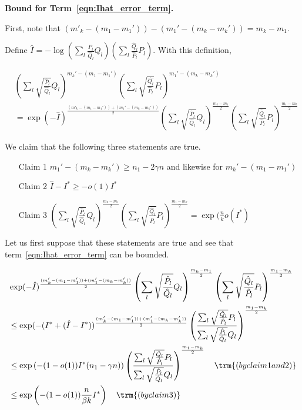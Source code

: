 \documentclass{article}
\begin{document}
\textbf{Bound for Term~\ref{eqn:Ihat_error_term}.}

First, note that $ (m'_k - (m_1 - m_1')) - (m_1' - (m_k - m_k')) = m_k - m_1$.

Define 
$\hat{I} = - \log \left( \sum_l \frac{\hat{P}_l}{\hat{Q}_l} Q_l \right) \left( \sum_l \frac{\hat{Q}_l}{\hat{P}_l} P_l \right) $. 
With this definition, 

\begin{align*}
& \left( \sum_l \sqrt{\frac{\hat{P}_l}{\hat{Q}_l} } Q_l \right)^{m_k' - (m_1 - m_1')} 
       \left( \sum_l \sqrt{\frac{\hat{Q_l}}{\hat{P}_l} } P_l \right)^{m_1' - (m_k - m_k')} \\
&= \exp( - \hat{I} )^{\frac{(m'_k - (m_1 - m_1')) + (m_1' - (m_k - m_k'))}{2}}  \left( \sum_l \sqrt{\frac{\hat{P}_l}{\hat{Q}_l}} Q_l \right)^{\frac{m_k - m_1}{2}} 
 \left( \sum_l \sqrt{\frac{\hat{Q}_l}{\hat{P}_l}} P_l \right)^{\frac{m_1 - m_k}{2}} 
\end{align*}

We claim that the following three statements are true. 
\begin{enumerate}
\item[Claim 1] $m_1' - (m_k - m_k') \geq n_1 - 2 \gamma n$ and likewise for $m_k' - (m_1 - m_1')$
\item[Claim 2] $\hat{I} - I^* \geq - o(1) I^*$
\item[Claim 3] $\left( \sum_l \sqrt{\frac{\hat{P}_l}{\hat{Q}_l}} Q_l \right)^{\frac{m_k - m_1}{2}} 
 \left( \sum_l \sqrt{\frac{\hat{Q}_l}{\hat{P}_l}} P_l \right)^{\frac{m_1 - m_k}{2}} = \exp(\frac{n}{k}  o(I^*)  $
\end{enumerate}

Let us first suppose that these statements are true and see that term~\ref{eqn:Ihat_error_term} can be bounded. 


\begin{align*}
& \exp( - \hat{I} )^{\frac{(m'_k - (m_1 - m_1')) + (m_1' - (m_k - m_k'))}{2}}  \left( \sum_l \sqrt{\frac{\hat{P}_l}{\hat{Q}_l}} Q_l \right)^{\frac{m_k - m_1}{2}} 
 \left( \sum_l \sqrt{\frac{\hat{Q}_l}{\hat{P}_l}} P_l \right)^{\frac{m_1 - m_k}{2}}  \\
&\leq  \exp( - (I^* + (\hat{I} - I^*) )^{\frac{(m'_k - (m_1 - m_1')) + (m_1' - (m_k - m_k'))}{2}}  
 \left( \frac{\sum_l \sqrt{\frac{\hat{Q}_l}{\hat{P}_l}} P_l}
             {\sum_l \sqrt{\frac{\hat{P}_l}{\hat{Q}_l}} Q_l} \right)^{\frac{m_1 - m_k}{2}}  
  \\
&\leq \exp \left( - (1-o(1)) I^* (n_1 - \gamma n) \right) 
   \left( \frac{\sum_l \sqrt{\frac{\hat{Q}_l}{\hat{P}_l}} P_l}
             {\sum_l \sqrt{\frac{\hat{P}_l}{\hat{Q}_l}} Q_l} \right)^{\frac{m_1 - m_k}{2}}  
   \quad \trm{(by claim 1 and 2)}\\
&\leq \exp \left( - (1-o(1)) \frac{n}{\beta k} I^*  \right) 
   \quad \trm{(by claim 3)}
\end{align*}
\end{document}
